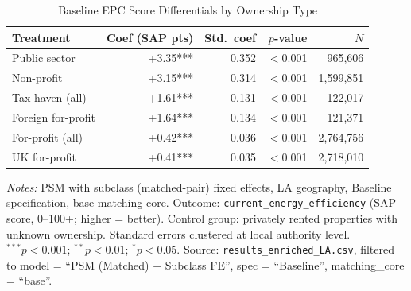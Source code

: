 \begin{table}[htbp]
\centering
\caption{Baseline EPC Score Differentials by Ownership Type}
\label{tab:h1_baseline}
\begin{tabular}{lrrrr}
\toprule
Treatment & Coef (SAP pts) & Std.\ coef & $p$-value & $N$ \\
\midrule
Public sector & +3.35*** & 0.352 & $<$0.001 & 965,606 \\
Non-profit & +3.15*** & 0.314 & $<$0.001 & 1,599,851 \\
Tax haven (all) & +1.61*** & 0.131 & $<$0.001 & 122,017 \\
Foreign for-profit & +1.64*** & 0.134 & $<$0.001 & 121,371 \\
For-profit (all) & +0.42*** & 0.036 & $<$0.001 & 2,764,756 \\
UK for-profit & +0.41*** & 0.035 & $<$0.001 & 2,718,010 \\
\bottomrule
\end{tabular}
\begin{minipage}{0.9\textwidth}
\vspace{4pt}
\footnotesize
\textit{Notes:} PSM with subclass (matched-pair) fixed effects, LA geography, Baseline specification, base matching core.
Outcome: \texttt{current\_energy\_efficiency} (SAP score, 0--100+; higher = better).
Control group: privately rented properties with unknown ownership.
Standard errors clustered at local authority level.
$^{***}p<0.001$; $^{**}p<0.01$; $^{*}p<0.05$.
Source: \texttt{results\_enriched\_LA.csv}, filtered to model = ``PSM (Matched) + Subclass FE'',
spec = ``Baseline'', matching\_core = ``base''.
\end{minipage}
\end{table}
